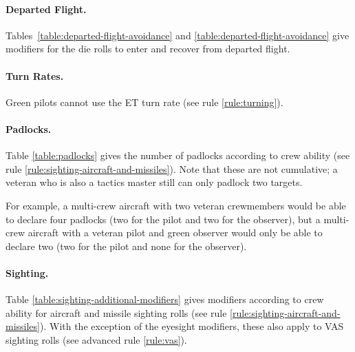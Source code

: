\begin{advancedrules}
{\paragraph{Departed Flight.} Tables~\ref{table:departed-flight-avoidance} and \ref{table:departed-flight-avoidance} give modifiers for the die rolls to enter and recover from departed flight.

\paragraph{Turn Rates.} Green pilots cannot use the ET turn rate (see rule \ref{rule:turning}).


\paragraph{Padlocks.} Table \ref{table:padlocks} gives the number of padlocks according to crew ability (see rule \ref{rule:sighting-aircraft-and-missiles}). Note that these are not cumulative; a veteran who is also a tactics master still can only padlock two targets. 

For example, a multi-crew aircraft with two veteran crewmembers would be able to declare four padlocks (two for the pilot and two for the observer), but a multi-crew aircraft with a veteran pilot and green observer would only be able to declare two (two for the pilot and none for the observer).

\paragraph{Sighting.} Table \ref{table:sighting-additional-modifiers} gives modifiers according to crew ability for aircraft and missile sighting rolls (see rule \ref{rule:sighting-aircraft-and-missiles}). With the exception of the eyesight modifiers, these also apply to VAS sighting rolls (see advanced rule \ref{rule:vas}).



}

\end{advancedrules}
